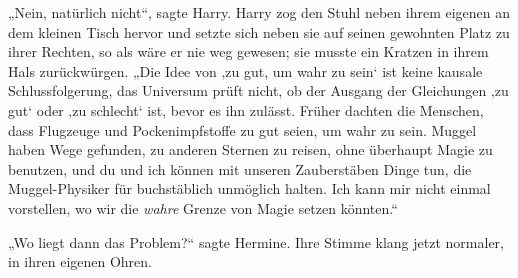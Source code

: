 „Nein, natürlich nicht“, sagte Harry. Harry zog den Stuhl neben ihrem eigenen an dem kleinen Tisch hervor und setzte sich neben sie auf seinen gewohnten Platz zu ihrer Rechten, so als wäre er nie weg gewesen; sie musste ein Kratzen in ihrem Hals zurückwürgen.
„Die Idee von ‚zu gut, um wahr zu sein‘ ist keine kausale Schlussfolgerung, das Universum prüft nicht, ob der Ausgang der Gleichungen ‚zu gut‘ oder ‚zu schlecht‘ ist, bevor es ihn zulässt. Früher dachten die Menschen, dass Flugzeuge und Pockenimpfstoffe zu gut seien, um wahr zu sein. Muggel haben Wege gefunden, zu anderen Sternen zu reisen, ohne überhaupt Magie zu benutzen, und du und ich können mit unseren Zauberstäben Dinge tun, die Muggel-Physiker für buchstäblich unmöglich halten. Ich kann mir nicht einmal vorstellen, wo wir die \emph{wahre} Grenze von Magie setzen könnten.“

„Wo liegt dann das Problem?“ sagte Hermine. Ihre Stimme klang jetzt normaler, in ihren eigenen Ohren.

